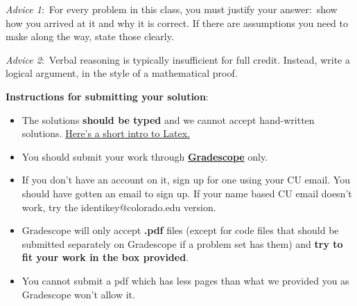 \documentclass[12pt]{article}
\theoremstyle{remark}
\begin{document}
\renewcommand{\headrulewidth}{0.5pt}

\phantom{Test}

\begin{small}
\textit{Advice 1}:\ For every problem in this class, you must justify your answer:\ show how you arrived at it and why it is correct. If there are assumptions you need to make along the way, state those clearly.
\vspace{-3mm} 

\textit{Advice 2}:\ Verbal reasoning is typically insufficient for full credit. Instead, write a logical argument, in the style of a mathematical proof.\\
\vspace{-3mm} 

\textbf{Instructions for submitting your solution}:
\vspace{-5mm} 

\begin{itemize}
	\item The solutions \textbf{should be typed} and we cannot accept hand-written solutions. \href{http://ece.uprm.edu/~caceros/latex/introduction.pdf}{Here's a short intro to Latex.}
	\item You should submit your work through \href{https://www.gradescope.com/courses/59294}{\textbf{Gradescope}} only.
	\item If you don't have an account on it, sign up for one using your CU email. You should have gotten an email to sign up. If your name based CU email doesn't work, try the identikey@colorado.edu version. 
	\item Gradescope will only accept \textbf{.pdf} files (except for code files that should be submitted separately on Gradescope if a problem set has them) and \textbf{try to fit your work in the box provided}. 
	\item You cannot submit a pdf which has less pages than what we provided you as Gradescope won't allow it. 
\end{itemize}
\vspace{-4mm} 
\end{small}

\hrulefill
\pagebreak
\end{document}
